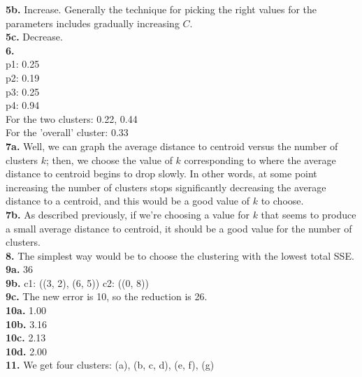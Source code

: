 \documentclass[10pt]{amsart}
\begin{document}
\textbf{5b.} Increase. Generally the technique for picking the right values for
the parameters includes gradually increasing $C$. \\

\textbf{5c.} Decrease. \\

\textbf{6.}   \\
p1: 0.25 \\
p2: 0.19 \\
p3: 0.25 \\
p4: 0.94 \\

For the two clusters: 0.22, 0.44 \\
For the 'overall' cluster: 0.33 \\

\textbf{7a.} Well, we can graph the average distance to centroid versus the 
number of clusters $k$; then, we choose the value of $k$ corresponding to 
where the average distance to centroid begins to drop slowly. In other words,
at some point increasing the number of clusters stops significantly decreasing
the average distance to a centroid, and this would be a good value of $k$ to
choose. \\

\textbf{7b.} As described previously, if we're choosing a value for $k$ that
seems to produce a small average distance to centroid, it should be a good 
value for the number of clusters. \\

\textbf{8.} The simplest way would be to choose the clustering with the lowest
total SSE. \\

\textbf{9a.} 36 \\

\textbf{9b.} c1: ((3, 2), (6, 5))   c2: ((0, 8)) \\

\textbf{9c.} The new error is 10, so the reduction is 26. \\

\textbf{10a.} 1.00 \\

\textbf{10b.} 3.16  \\

\textbf{10c.} 2.13\\

\textbf{10d.} 2.00\\

\textbf{11.} We get four clusters: (a), (b, c, d), (e, f), (g)\\
\end{document}
